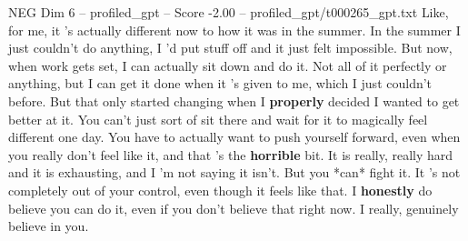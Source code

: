 \begin{textsample}{NEG Dim 6 – profiled\_gpt – Score -2.00 – profiled\_gpt/t000265\_gpt.txt}  \label{ex:f6_neg_017}
Like, for me, it ’s actually different now to how it was in the summer.
In the summer I just couldn't do anything, I ’d put stuff off and it just felt impossible.
But now, when work gets set, I can actually sit down and do it.
Not all of it perfectly or anything, but I can get it done when it ’s given to me, which I just couldn't before.
But that only started changing when I \textbf{properly} decided I wanted to get better at it.
You can't just sort of sit there and wait for it to magically feel different one day.
You have to actually want to push yourself forward, even when you really don't feel like it, and that ’s the \textbf{horrible} bit.
It is really, really hard and it is exhausting, and I ’m not saying it isn't.
But you *can* fight it.
It ’s not completely out of your control, even though it feels like that.
I \textbf{honestly} do believe you can do it, even if you don't believe that right now.
I really, genuinely believe in you.

\end{textsample}
